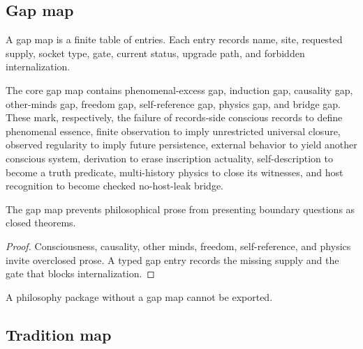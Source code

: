 \subsection{Gap map}
\label{subsec:philosophy-gap-map}

\begin{definition}
\label{def:philosophy-gap-map}
A gap map is a finite table of entries. Each entry records name, site,
requested supply, socket type, gate, current status, upgrade path, and
forbidden internalization.
\end{definition}

\begin{definition}
\label{def:philosophy-core-gaps}
The core gap map contains phenomenal-excess gap, induction gap,
causality gap, other-minds gap, freedom gap, self-reference gap,
physics gap, and bridge gap. These mark, respectively, the failure of
records-side conscious records to define phenomenal essence, finite
observation to imply unrestricted universal closure, observed
regularity to imply future persistence, external behavior to yield
another conscious system, derivation to erase inscription actuality,
self-description to become a truth predicate, multi-history physics to
close its witnesses, and host recognition to become checked
no-host-leak bridge.
\end{definition}

\begin{theorem}
\label{thm:philosophy-gap-map-prevents-closure-illusion}
The gap map prevents philosophical prose from presenting boundary
questions as closed theorems.
\end{theorem}
\begin{proof}
Consciousness, causality, other minds, freedom, self-reference, and
physics invite overclosed prose. A typed gap entry records the missing
supply and the gate that blocks internalization.
\end{proof}

\begin{corollary}
\label{cor:philosophy-gap-map-necessary}
A philosophy package without a gap map cannot be exported.
\end{corollary}

\subsection{Tradition map}
\label{subsec:philosophy-package-tradition-map}

